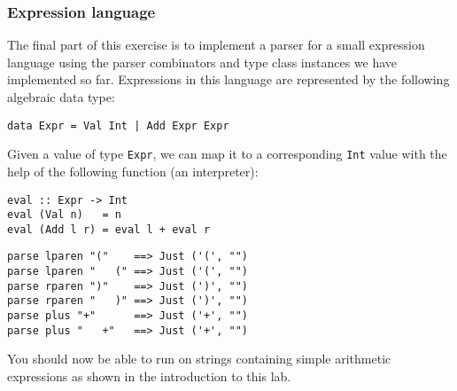 \taskLine 

\subsubsection{Expression language}

The final part of this exercise is to implement a parser for a small expression language using the parser combinators and type class instances we have implemented so far. Expressions in this language are represented by the following algebraic data type:
\begin{verbatim}
data Expr = Val Int | Add Expr Expr
\end{verbatim}
Given a value of type \texttt{\small Expr}, we can map it to a corresponding \texttt{\small Int} value with the help of the following function (an interpreter):
\begin{verbatim}
eval :: Expr -> Int 
eval (Val n)   = n
eval (Add l r) = eval l + eval r
\end{verbatim}

\taskLine 

\begin{verbatim}
parse lparen "("    ==> Just ('(', "")
parse lparen "   (" ==> Just ('(', "")
parse rparen ")"    ==> Just (')', "")
parse rparen "   )" ==> Just (')', "")
parse plus "+"      ==> Just ('+', "")
parse plus "   +"   ==> Just ('+', "")
\end{verbatim}


You should now be able to run  on strings containing simple arithmetic expressions as shown in the introduction to this lab.

\taskLine 
